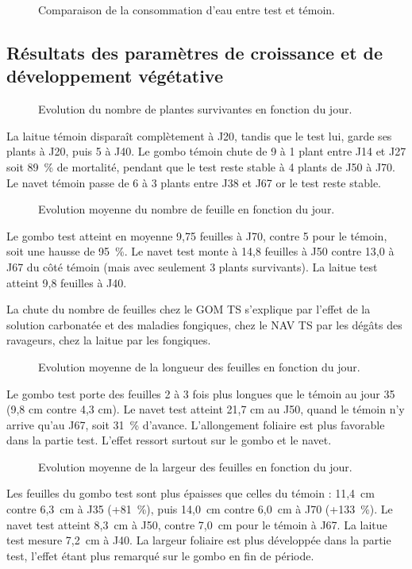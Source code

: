 \begin{figure}[H]
    \centering
    \caption{Comparaison de la consommation d'eau entre test et témoin. }
    \label{fig:eauTotal}
\end{figure}

\subsection{Résultats des paramètres de croissance et de développement végétative}
\begin{figure}[H]
    \centering
    \caption{Evolution du nombre de plantes survivantes en fonction du jour. }
    \label{fig:survivant5}
\end{figure}
La laitue témoin disparaît complètement à J20, tandis que le test lui, garde ses plants à J20, puis 5 à J40. Le gombo témoin chute de 9 à 1 plant entre J14 et J27 soit 89~\% de mortalité, pendant que le test reste stable à 4 plants de J50 à J70. Le navet témoin passe de 6 à 3 plants entre J38 et J67 or le test reste stable.

\begin{figure}[H]
    \centering
    \caption{Evolution moyenne du nombre de feuille en fonction du jour. }
    \label{fig:nbre-feuille5}
\end{figure}
Le gombo test atteint en moyenne  9,75 feuilles à J70, contre 5 pour le témoin, soit une hausse de 95~\%. Le navet test monte à 14,8 feuilles à J50  contre 13,0 à J67 du côté témoin (mais avec seulement 3 plants survivants). La laitue test atteint 9,8 feuilles à J40.

La chute du nombre de feuilles chez le GOM TS s’explique par l’effet de la solution carbonatée et des maladies fongiques, chez le NAV TS par les dégâts des ravageurs, chez la laitue par les fongiques.
\begin{figure}[H]
    \centering
    \caption{Evolution moyenne de la longueur des feuilles en fonction du jour. }
    \label{fig:longueur-feuille5}
\end{figure}
Le gombo test porte des feuilles 2 à 3 fois plus longues que le témoin au jour 35 (9,8 cm contre 4,3 cm). Le navet test atteint 21,7 cm au J50, quand le témoin n'y arrive qu'au J67, soit 31~\% d'avance. L'allongement foliaire est plus favorable dans la partie test. L'effet ressort surtout sur le gombo et le navet.
\begin{figure}[H]
    \centering
    \caption{Evolution moyenne de la largeur des feuilles en fonction du jour. }
    \label{fig:largeur-feuille5}
\end{figure}
Les feuilles du gombo test sont plus épaisses que celles du témoin : 11,4~cm contre 6,3~cm à J35 (+81~\%), puis 14,0~cm contre 6,0~cm à J70 (+133~\%). Le navet test atteint 8,3~cm à J50, contre 7,0~cm pour le témoin à J67. La laitue test mesure 7,2~cm à J40. 
La largeur foliaire est plus développée dans la partie test, l'effet étant plus remarqué sur le gombo en fin de période.

